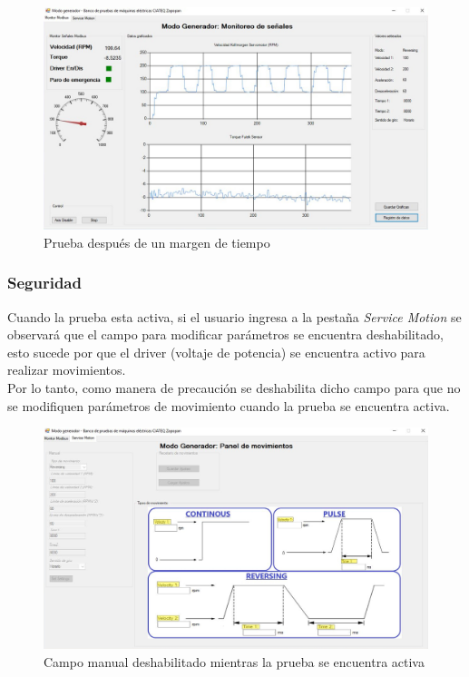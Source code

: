 \documentclass[12pt,titlepage]{article}
\begin{document}
\begin{figure}[H]
\hspace*{0.1cm} 
\includegraphics[scale=0.53]{grapsh2}
\caption{Prueba después de un margen de tiempo }
\end{figure}

\newpage
\subsubsection{Seguridad}
Cuando la prueba esta activa, si el usuario ingresa a la pestaña \textit{Service Motion} se observará que el campo para modificar parámetros se encuentra deshabilitado, esto sucede por que el driver (voltaje de potencia) se encuentra activo para realizar movimientos. \\

Por lo tanto, como manera de precaución se deshabilita dicho campo para que no se modifiquen parámetros de movimiento cuando la prueba se encuentra activa. \\

\begin{figure}[H]
\hspace*{0.1cm} 
\includegraphics[scale=0.53]{no_enable_settings}
\caption{Campo manual deshabilitado mientras la prueba se encuentra activa}
\end{figure}
\end{document}

